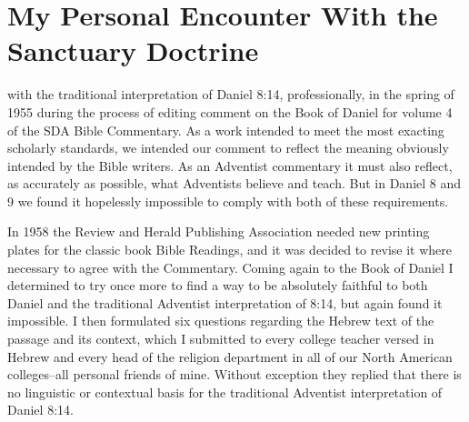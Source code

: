 \chapter{My Personal Encounter With the Sanctuary Doctrine}
\label{ch:personal}

 with the traditional interpretation of Daniel
8:14, professionally, in the spring of 1955 during the process of editing
comment on the Book of Daniel for volume 4 of the SDA Bible Commentary. As
a work intended to meet the most exacting scholarly standards, we intended
our comment to reflect the meaning obviously intended by the Bible writers.
As an Adventist commentary it must also reflect, as accurately as possible,
what Adventists believe and teach. But in Daniel 8 and 9 we found it
hopelessly impossible to comply with both of these requirements.

In 1958 the Review and Herald Publishing Association needed new printing
plates for the classic book Bible Readings, and it was decided to revise it
where necessary to agree with the Commentary. Coming again to the Book of
Daniel I determined to try once more to find a way to be absolutely faithful
to both Daniel and the traditional Adventist interpretation of 8:14, but
again found it impossible. I then formulated six questions regarding the
Hebrew text of the passage and its context, which I submitted to every
college teacher versed in Hebrew and every head of the religion department 
in all of our North American colleges--all personal friends of mine.
Without exception they replied that there is no linguistic or contextual
basis for the traditional Adventist interpretation of Daniel 8:14.

